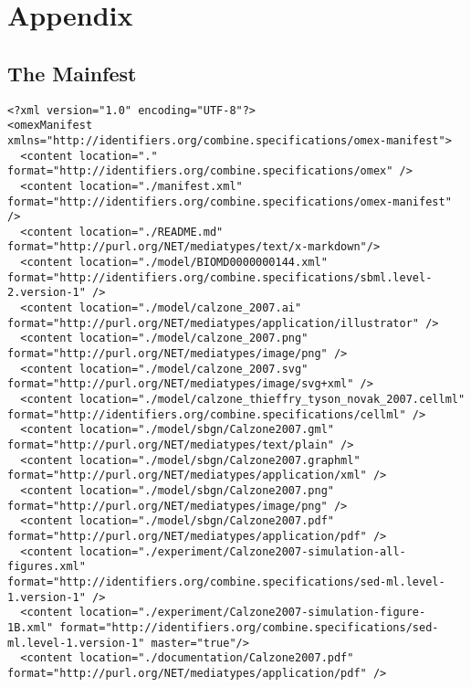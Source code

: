 \section{Appendix}
\label{sec:appendix}

\subsection{The Mainfest}
\label{sec:manifest}
\begin{mdframed}[style=mddefault,frametitle={The \texttt{manifest.xml} of the final COMBINE archive}]
\begin{verbatim}
<?xml version="1.0" encoding="UTF-8"?>
<omexManifest xmlns="http://identifiers.org/combine.specifications/omex-manifest">
  <content location="." format="http://identifiers.org/combine.specifications/omex" />
  <content location="./manifest.xml" format="http://identifiers.org/combine.specifications/omex-manifest" />
  <content location="./README.md" format="http://purl.org/NET/mediatypes/text/x-markdown"/>
  <content location="./model/BIOMD0000000144.xml" format="http://identifiers.org/combine.specifications/sbml.level-2.version-1" />
  <content location="./model/calzone_2007.ai" format="http://purl.org/NET/mediatypes/application/illustrator" />
  <content location="./model/calzone_2007.png" format="http://purl.org/NET/mediatypes/image/png" />
  <content location="./model/calzone_2007.svg" format="http://purl.org/NET/mediatypes/image/svg+xml" />
  <content location="./model/calzone_thieffry_tyson_novak_2007.cellml" format="http://identifiers.org/combine.specifications/cellml" />
  <content location="./model/sbgn/Calzone2007.gml" format="http://purl.org/NET/mediatypes/text/plain" />
  <content location="./model/sbgn/Calzone2007.graphml" format="http://purl.org/NET/mediatypes/application/xml" />
  <content location="./model/sbgn/Calzone2007.png" format="http://purl.org/NET/mediatypes/image/png" />
  <content location="./model/sbgn/Calzone2007.pdf" format="http://purl.org/NET/mediatypes/application/pdf" />
  <content location="./experiment/Calzone2007-simulation-all-figures.xml" format="http://identifiers.org/combine.specifications/sed-ml.level-1.version-1" />
  <content location="./experiment/Calzone2007-simulation-figure-1B.xml" format="http://identifiers.org/combine.specifications/sed-ml.level-1.version-1" master="true"/>
  <content location="./documentation/Calzone2007.pdf" format="http://purl.org/NET/mediatypes/application/pdf" />

\end{verbatim}
\end{mdframed}
